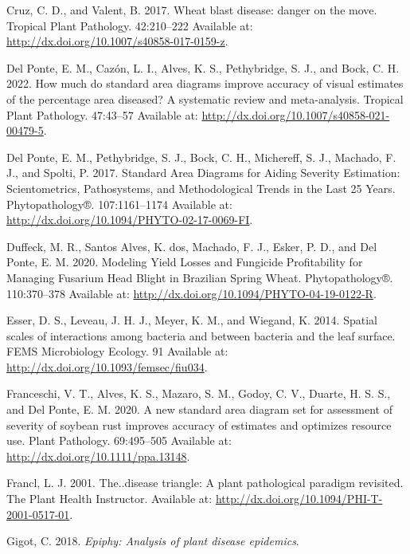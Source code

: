 \documentclass[
  letterpaper,
]{book}
\newlength{\cslhangindent}
\newlength{\cslentryspacingunit} %
\newenvironment{CSLReferences}[2] %
 {%
  \setlength{\parindent}{0pt}
  \ifodd #1
  \let\oldpar\par
  \def\par{\hangindent=\cslhangindent\oldpar}
  \fi
  \setlength{\parskip}{#2\cslentryspacingunit}
 }%
 {}
\begin{document}
\begin{CSLReferences}{0}{0}
\leavevmode{}%
Cruz, C. D., and Valent, B. 2017. Wheat blast disease: danger on the
move. Tropical Plant Pathology. 42:210--222 Available at:
\url{http://dx.doi.org/10.1007/s40858-017-0159-z}.

\leavevmode{}%
Del Ponte, E. M., Cazón, L. I., Alves, K. S., Pethybridge, S. J., and
Bock, C. H. 2022. How much do standard area diagrams improve accuracy of
visual estimates of the percentage area diseased? A systematic review
and meta-analysis. Tropical Plant Pathology. 47:43--57 Available at:
\url{http://dx.doi.org/10.1007/s40858-021-00479-5}.

\leavevmode{}%
Del Ponte, E. M., Pethybridge, S. J., Bock, C. H., Michereff, S. J.,
Machado, F. J., and Spolti, P. 2017. Standard Area Diagrams for Aiding
Severity Estimation: Scientometrics, Pathosystems, and Methodological
Trends in the Last 25 Years. Phytopathology®. 107:1161--1174 Available
at: \url{http://dx.doi.org/10.1094/PHYTO-02-17-0069-FI}.

\leavevmode{}%
Duffeck, M. R., Santos Alves, K. dos, Machado, F. J., Esker, P. D., and
Del Ponte, E. M. 2020. Modeling Yield Losses and Fungicide Profitability
for Managing Fusarium Head Blight in Brazilian Spring Wheat.
Phytopathology®. 110:370--378 Available at:
\url{http://dx.doi.org/10.1094/PHYTO-04-19-0122-R}.

\leavevmode{}%
Esser, D. S., Leveau, J. H. J., Meyer, K. M., and Wiegand, K. 2014.
Spatial scales of interactions among bacteria and between bacteria and
the leaf surface. FEMS Microbiology Ecology. 91 Available at:
\url{http://dx.doi.org/10.1093/femsec/fiu034}.

\leavevmode{}%
Franceschi, V. T., Alves, K. S., Mazaro, S. M., Godoy, C. V., Duarte, H.
S. S., and Del Ponte, E. M. 2020. A new standard area diagram set for
assessment of severity of soybean rust improves accuracy of estimates
and optimizes resource use. Plant Pathology. 69:495--505 Available at:
\url{http://dx.doi.org/10.1111/ppa.13148}.

\leavevmode{}%
Francl, L. J. 2001. The..disease triangle: A plant pathological paradigm
revisited. The Plant Health Instructor. Available at:
\url{http://dx.doi.org/10.1094/PHI-T-2001-0517-01}.

\leavevmode{}%
Gigot, C. 2018. \emph{Epiphy: Analysis of plant disease epidemics}.


\end{CSLReferences}
\end{document}
